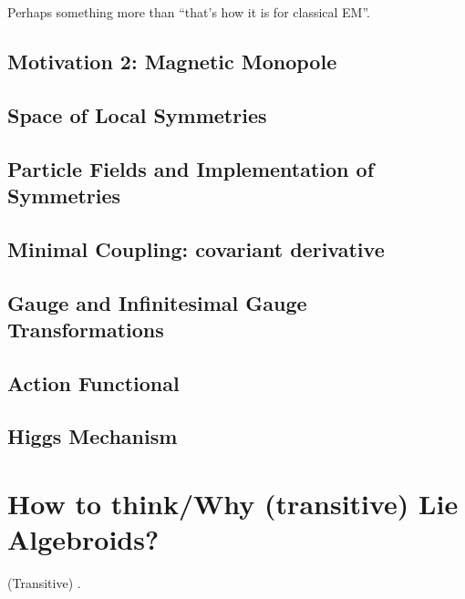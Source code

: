  Perhaps something more than ``that's how it is for classical EM''.

\subsection{Motivation 2: Magnetic Monopole}

\subsection{Space of Local Symmetries}

\subsection{Particle Fields and Implementation of Symmetries}

\subsection{Minimal Coupling: covariant derivative}

\subsection{Gauge and Infinitesimal Gauge Transformations}

\subsection{Action Functional}

\subsection{Higgs Mechanism}

\section{How to think/Why (transitive) Lie Algebroids?}

(Transitive)  .

